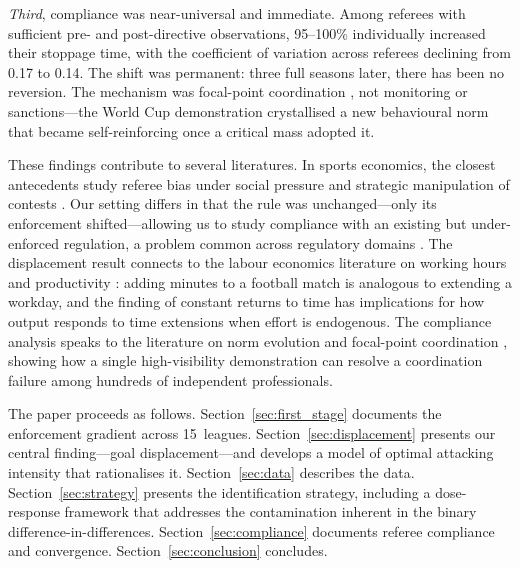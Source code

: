 \textit{Third}, compliance was near-universal and immediate. Among
referees with sufficient pre- and post-directive observations,
95--100\% individually increased their stoppage time, with the
coefficient of variation across referees declining from 0.17 to 0.14.
The shift was permanent: three full seasons later, there has been no
reversion. The mechanism was focal-point coordination
\citep{schelling1960strategy}, not monitoring or sanctions---the World
Cup demonstration crystallised a new behavioural norm that became
self-reinforcing once a critical mass adopted it.

These findings contribute to several literatures. In sports economics,
the closest antecedents study referee bias under social pressure
\citep{garicano2005favoritism, dohmen2008professionals,
pricewolfers2010} and strategic manipulation of contests
\citep{dugganlevitt2002}. Our setting differs in that the rule was
unchanged---only its enforcement shifted---allowing us to study
compliance with an existing but under-enforced regulation, a problem
common across regulatory domains \citep{duflo2013truth,
johnson2020compliance}. The displacement result connects to the labour
economics literature on working hours and productivity
\citep{pencavel2015effects}: adding minutes to a football match is
analogous to extending a workday, and the finding of constant returns
to time has implications for how output responds to time extensions
when effort is endogenous. The compliance analysis speaks to the
literature on norm evolution and focal-point coordination
\citep{young1993evolution, rothockenfels2002}, showing how a single
high-visibility demonstration can resolve a coordination failure
among hundreds of independent professionals.

The paper proceeds as follows. Section~\ref{sec:first_stage} documents
the enforcement gradient across 15~leagues.
Section~\ref{sec:displacement} presents our central finding---goal
displacement---and develops a model of optimal attacking intensity that
rationalises it. Section~\ref{sec:data} describes the data.
Section~\ref{sec:strategy} presents the identification strategy,
including a dose-response framework that addresses the contamination
inherent in the binary difference-in-differences.
Section~\ref{sec:compliance} documents referee compliance and
convergence. Section~\ref{sec:conclusion} concludes.

